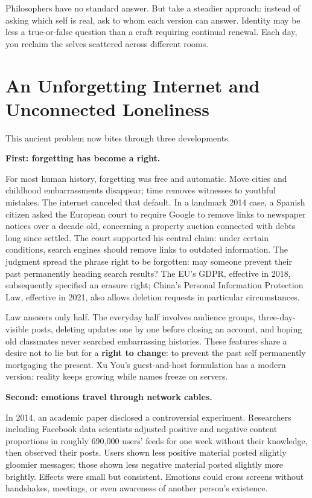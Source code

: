 Philosophers have no standard answer. But take a steadier approach: instead of asking which self is real, ask to whom each version can answer. Identity may be less a true-or-false question than a craft requiring continual renewal. Each day, you reclaim the selves scattered across different rooms.

\section[Internet Memory and Loneliness]{An Unforgetting Internet and Unconnected Loneliness}
This ancient problem now bites through three developments.

\textbf{First: forgetting has become a right.}

For most human history, forgetting was free and automatic. Move cities and childhood embarrassments disappear; time removes witnesses to youthful mistakes. The internet canceled that default. In a landmark 2014 case, a Spanish citizen asked the European court to require Google to remove links to newspaper notices over a decade old, concerning a property auction connected with debts long since settled. The court supported his central claim: under certain conditions, search engines should remove links to outdated information. The judgment spread the phrase right to be forgotten: may someone prevent their past permanently heading search results? The EU's GDPR, effective in 2018, subsequently specified an erasure right; China's Personal Information Protection Law, effective in 2021, also allows deletion requests in particular circumstances.

Law answers only half. The everyday half involves audience groups, three-day-visible posts, deleting updates one by one before closing an account, and hoping old classmates never searched embarrassing histories. These features share a desire not to lie but for a \textbf{right to change}: to prevent the past self permanently mortgaging the present. Xu You's guest-and-host formulation has a modern version: reality keeps growing while names freeze on servers.

\textbf{Second: emotions travel through network cables.}

In 2014, an academic paper disclosed a controversial experiment. Researchers including Facebook data scientists adjusted positive and negative content proportions in roughly 690,000 users' feeds for one week without their knowledge, then observed their posts. Users shown less positive material posted slightly gloomier messages; those shown less negative material posted slightly more brightly. Effects were small but consistent. Emotions could cross screens without handshakes, meetings, or even awareness of another person's existence.


